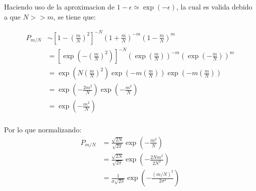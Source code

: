 Haciendo uso de la aproximacion de $1-\epsilon \simeq \exp (-\epsilon)$, la cual es valida debido a que $N>> m$, se tiene que:

\begin{align*}
    P_{m / N} &\sim \left[1-\left(\frac{m}{N}\right)^{2}\right]^{-N}\left(1+\frac{m}{N}\right)^{-m}\left(1-\frac{m}{N}\right)^{m} \\
    &=\left[\exp \left(-\left(\frac{m}{N}\right)^{2}\right)\right]^{-N}\left(\exp \left(\frac{m}{N}\right)\right)^{-m}\left(\exp \left(-\frac{m}{N}\right)\right)^{m} \\
    &=\exp \left(N\left(\frac{m}{N}\right)^{2}\right) \exp \left(-m\left(\frac{m}{N}\right)\right) \exp \left(-m\left(\frac{m}{N}\right)\right) \\
    &=\exp \left(-\frac{2m^{2}}{N}\right) \exp \left(-\frac{m^{2}}{N}\right) \\
    &=\exp \left(-\frac{m^{2}}{N}\right) \\
\end{align*}     

Por lo que normalizando:
\begin{align*}
     P_{m/N} &=  \frac{\sqrt{2 N}}{\sqrt{2 \pi}} \exp \left(-\frac{ m^{2}}{N}\right)\\ 
    &= \frac{\sqrt{2 N}}{\sqrt{2 \pi}}  \exp \left(-\frac{ 2Nm^{2}}{2N^2}\right)\\
    &= \frac{1}{\sigma \sqrt{2 \pi}} \exp \left(-\frac{ (m/N)^2}{2\sigma^2}\right)\\
\end{align*}